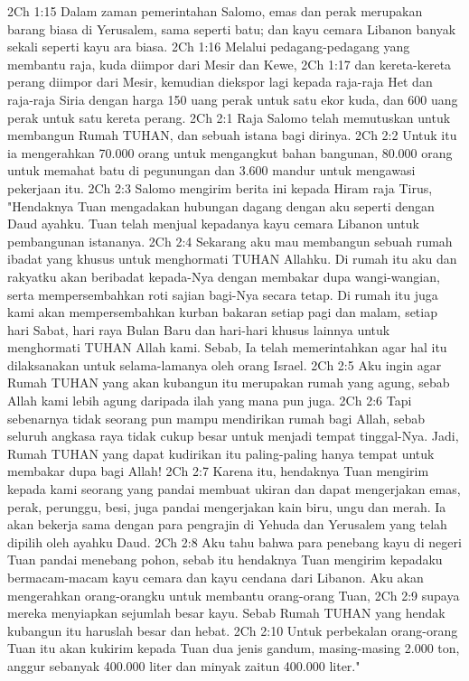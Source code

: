 2Ch 1:15  Dalam zaman pemerintahan Salomo, emas dan perak merupakan barang biasa di Yerusalem, sama seperti batu; dan kayu cemara Libanon banyak sekali seperti kayu ara biasa.
2Ch 1:16  Melalui pedagang-pedagang yang membantu raja, kuda diimpor dari Mesir dan Kewe,
2Ch 1:17  dan kereta-kereta perang diimpor dari Mesir, kemudian diekspor lagi kepada raja-raja Het dan raja-raja Siria dengan harga 150 uang perak untuk satu ekor kuda, dan 600 uang perak untuk satu kereta perang.
2Ch 2:1  Raja Salomo telah memutuskan untuk membangun Rumah TUHAN, dan sebuah istana bagi dirinya.
2Ch 2:2  Untuk itu ia mengerahkan 70.000 orang untuk mengangkut bahan bangunan, 80.000 orang untuk memahat batu di pegunungan dan 3.600 mandur untuk mengawasi pekerjaan itu.
2Ch 2:3  Salomo mengirim berita ini kepada Hiram raja Tirus, "Hendaknya Tuan mengadakan hubungan dagang dengan aku seperti dengan Daud ayahku. Tuan telah menjual kepadanya kayu cemara Libanon untuk pembangunan istananya.
2Ch 2:4  Sekarang aku mau membangun sebuah rumah ibadat yang khusus untuk menghormati TUHAN Allahku. Di rumah itu aku dan rakyatku akan beribadat kepada-Nya dengan membakar dupa wangi-wangian, serta mempersembahkan roti sajian bagi-Nya secara tetap. Di rumah itu juga kami akan mempersembahkan kurban bakaran setiap pagi dan malam, setiap hari Sabat, hari raya Bulan Baru dan hari-hari khusus lainnya untuk menghormati TUHAN Allah kami. Sebab, Ia telah memerintahkan agar hal itu dilaksanakan untuk selama-lamanya oleh orang Israel.
2Ch 2:5  Aku ingin agar Rumah TUHAN yang akan kubangun itu merupakan rumah yang agung, sebab Allah kami lebih agung daripada ilah yang mana pun juga.
2Ch 2:6  Tapi sebenarnya tidak seorang pun mampu mendirikan rumah bagi Allah, sebab seluruh angkasa raya tidak cukup besar untuk menjadi tempat tinggal-Nya. Jadi, Rumah TUHAN yang dapat kudirikan itu paling-paling hanya tempat untuk membakar dupa bagi Allah!
2Ch 2:7  Karena itu, hendaknya Tuan mengirim kepada kami seorang yang pandai membuat ukiran dan dapat mengerjakan emas, perak, perunggu, besi, juga pandai mengerjakan kain biru, ungu dan merah. Ia akan bekerja sama dengan para pengrajin di Yehuda dan Yerusalem yang telah dipilih oleh ayahku Daud.
2Ch 2:8  Aku tahu bahwa para penebang kayu di negeri Tuan pandai menebang pohon, sebab itu hendaknya Tuan mengirim kepadaku bermacam-macam kayu cemara dan kayu cendana dari Libanon. Aku akan mengerahkan orang-orangku untuk membantu orang-orang Tuan,
2Ch 2:9  supaya mereka menyiapkan sejumlah besar kayu. Sebab Rumah TUHAN yang hendak kubangun itu haruslah besar dan hebat.
2Ch 2:10  Untuk perbekalan orang-orang Tuan itu akan kukirim kepada Tuan dua jenis gandum, masing-masing 2.000 ton, anggur sebanyak 400.000 liter dan minyak zaitun 400.000 liter."
